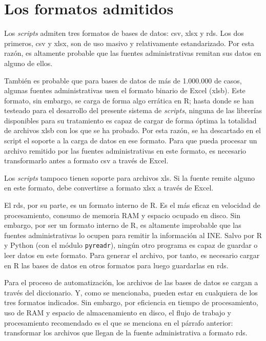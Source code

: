 \documentclass[
  spanish,
]{book}
\begin{document}
\hypertarget{los-formatos-admitidos}{%
\section{Los formatos admitidos}\label{los-formatos-admitidos}}

Los \emph{scripts} admiten tres formatos de bases de datos: csv, xlsx y rds. Los dos primeros, csv y xlsx, son de uso masivo y relativamente estandarizado. Por esta razón, es altamente probable que las fuentes administrativas remitan sus datos en alguno de ellos.

También es probable que para bases de datos de más de 1.000.000 de casos, algunas fuentes administrativas usen el formato binario de Excel (xlsb). Este formato, sin embargo, se carga de forma algo errática en R; hasta donde se han testeado para el desarrollo del presente sistema de \emph{scripts}, ninguna de las librerías disponibles para su tratamiento es capaz de cargar de forma óptima la totalidad de archivos xlsb con los que se ha probado. Por esta razón, se ha descartado en el script el soporte a la carga de datos en ese formato. Para que pueda procesar un archivo remitido por las fuentes administrativas en este formato, es necesario transformarlo antes a formato csv a través de Excel.

Los \emph{scripts} tampoco tienen soporte para archivos xls. Si la fuente remite alguno en este formato, debe convertirse a formato xlsx a través de Excel.

El rds, por su parte, es un formato interno de R. Es el más eficaz en velocidad de procesamiento, consumo de memoria RAM y espacio ocupado en disco. Sin embargo, por ser un formato interno de R, es altamente improbable que las fuentes administrativas lo ocupen para remitir la información al INE. Salvo por R y Python (con el módulo \texttt{pyreadr}), ningún otro programa es capaz de guardar o leer datos en este formato. Para generar el archivo, por tanto, es necesario cargar en R las bases de datos en otros formatos para luego guardarlas en rds.

Para el proceso de automatización, los archivos de las bases de datos se cargan a través del diccionario. Y, como se mencionaba, pueden estar en cualquiera de los tres formatos indicados. Sin embargo, por eficiencia en tiempo de procesamiento, uso de RAM y espacio de almacenamiento en disco, el flujo de trabajo y procesamiento recomendado es el que se menciona en el párrafo anterior: transformar los archivos que llegan de la fuente administrativa a formato rds.
\end{document}
